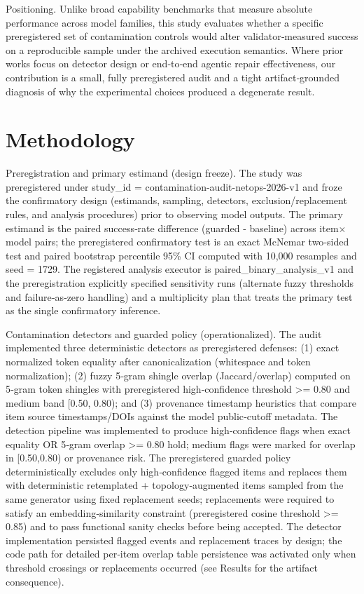 \documentclass[conference]{IEEEtran}
\begin{document}
Positioning. Unlike broad capability benchmarks that measure absolute performance across model families, this study evaluates whether a specific preregistered set of contamination controls would alter validator‑measured success on a reproducible sample under the archived execution semantics. Where prior works focus on detector design or end‑to‑end agentic repair effectiveness, our contribution is a small, fully preregistered audit and a tight artifact‑grounded diagnosis of why the experimental choices produced a degenerate result.

\section{Methodology}
Preregistration and primary estimand (design freeze). The study was preregistered under study\_id = contamination-audit-netops-2026-v1 and froze the confirmatory design (estimands, sampling, detectors, exclusion/replacement rules, and analysis procedures) prior to observing model outputs. The primary estimand is the paired success‑rate difference (guarded - baseline) across item\ensuremath{\times}model pairs; the preregistered confirmatory test is an exact McNemar two‑sided test and paired bootstrap percentile 95\% CI computed with 10,000 resamples and seed = 1729. The registered analysis executor is paired\_binary\_analysis\_v1 and the preregistration explicitly specified sensitivity runs (alternate fuzzy thresholds and failure‑as‑zero handling) and a multiplicity plan that treats the primary test as the single confirmatory inference.

Contamination detectors and guarded policy (operationalized). The audit implemented three deterministic detectors as preregistered defenses: (1) exact normalized token equality after canonicalization (whitespace and token normalization); (2) fuzzy 5‑gram shingle overlap (Jaccard/overlap) computed on 5‑gram token shingles with preregistered high‑confidence threshold >= 0.80 and medium band [0.50, 0.80); and (3) provenance timestamp heuristics that compare item source timestamps/DOIs against the model public‑cutoff metadata. The detection pipeline was implemented to produce high‑confidence flags when exact equality OR 5‑gram overlap >= 0.80 hold; medium flags were marked for overlap in [0.50,0.80) or provenance risk. The preregistered guarded policy deterministically excludes only high‑confidence flagged items and replaces them with deterministic retemplated + topology‑augmented items sampled from the same generator using fixed replacement seeds; replacements were required to satisfy an embedding‑similarity constraint (preregistered cosine threshold >= 0.85) and to pass functional sanity checks before being accepted. The detector implementation persisted flagged events and replacement traces by design; the code path for detailed per‑item overlap table persistence was activated only when threshold crossings or replacements occurred (see Results for the artifact consequence).
\end{document}
